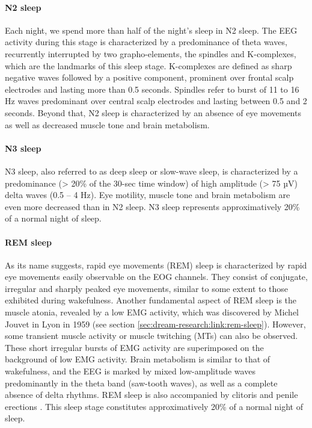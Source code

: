 \paragraph{N2 sleep}
Each night, we spend more than half of the night’s sleep in N2 sleep. The EEG activity during this stage is characterized by a predominance of theta waves, recurrently interrupted by two grapho-elements, the spindles and K-complexes, which are the landmarks of this sleep stage. K-complexes are defined as sharp negative waves followed by a positive component, prominent over frontal scalp electrodes and lasting more than 0.5 seconds. Spindles refer to burst of 11 to 16 Hz waves predominant over central scalp electrodes and lasting between 0.5 and 2 seconds. Beyond that, N2 sleep is characterized by an absence of eye movements as well as decreased muscle tone and brain metabolism.

\paragraph{N3 sleep}
N3 sleep, also referred to as deep sleep or slow-wave sleep, is characterized by a predominance (> 20\% of the 30-sec time window) of high amplitude (> 75 µV) delta waves (0.5 – 4 Hz). Eye motility, muscle tone and brain metabolism are even more decreased than in N2 sleep. N3 sleep represents approximatively 20\% of a normal night of sleep.

\paragraph{REM sleep}
As its name suggests, rapid eye movements (REM) sleep is characterized by rapid eye movements easily observable on the EOG channels. They consist of conjugate, irregular and sharply peaked eye movements, similar to some extent to those exhibited during wakefulness. Another fundamental aspect of REM sleep is the muscle atonia, revealed by a low EMG activity, which was discovered by Michel Jouvet in Lyon in 1959 (see section \ref{sec:dream-research:link:rem-sleep}). However, some transient muscle activity or muscle twitching (MTs) can also be observed. These short irregular bursts of EMG activity are superimposed on the background of low EMG activity. Brain metabolism is similar to that of wakefulness, and the EEG is marked by mixed low-amplitude waves predominantly in the theta band (saw-tooth waves), as well as a complete absence of delta rhythms. REM sleep is also accompanied by clitoris and penile erections \citep{fisher_cycle_1965, abel_womens_1979}. This sleep stage constitutes approximatively 20\% of a normal night of sleep.

